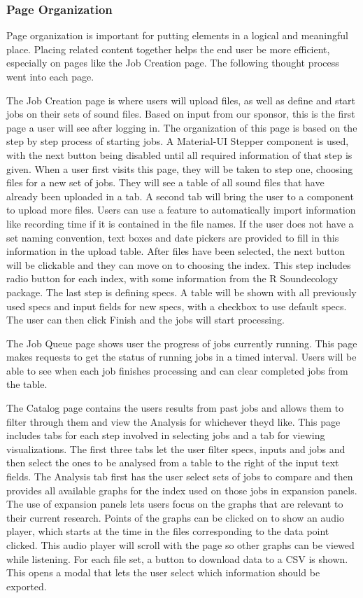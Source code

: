 \subsubsection{Page Organization}
Page organization is important for putting elements in a logical and meaningful place. Placing related content together helps the end user be more efficient, especially on pages like the Job Creation page. The following thought process went into each page.\par
The Job Creation page is where users will upload files, as well as define and start jobs on their sets of sound files. Based on input from our sponsor, this is the first page a user will see after logging in. The organization of this page is based on the step by step process of starting jobs. A Material-UI Stepper component is used, with the next button being disabled until all required information of that step is given. When a user first visits this page, they will be taken to step one, choosing files for a new set of jobs. They will see a table of all sound files that have already been uploaded in a tab. A second tab will bring the user to a component to upload more files. Users can use a feature to automatically import information like recording time if it is contained in the file names. If the user does not have a set naming convention, text boxes and date pickers are provided to fill in this information in the upload table. After files have been selected, the next button will be clickable and they can move on to choosing the index. This step includes radio button for each index, with some information from the R Soundecology package. The last step is defining specs. A table will be shown with all previously used specs and input fields for new specs, with a checkbox to use default specs. The user can then click Finish and the jobs will start processing.\par
The Job Queue page shows user the progress of jobs currently running. This page makes requests to get the status of running jobs in a timed interval. Users will be able to see when each job finishes processing and can clear completed jobs from the table.\par 
The Catalog page contains the user\textquotesingle s results from past jobs and allows them to filter through them and view the Analysis for whichever they\textquotesingle d like. This page includes tabs for each step involved in selecting jobs and a tab for viewing visualizations. The first three tabs let the user filter specs, inputs and jobs and then select the ones to be analysed from a table to the right of the input text fields. The Analysis tab first has the user select sets of jobs to compare and then provides all available graphs for the index used on those jobs in expansion panels. The use of expansion panels lets users focus on the graphs that are relevant to their current research. Points of the graphs can be clicked on to show an audio player, which starts at the time in the files corresponding to the data point clicked. This audio player will scroll with the page so other graphs can be viewed while listening. For each file set, a button to download data to a CSV is shown. This opens a modal that lets the user select which information should be exported.\par

